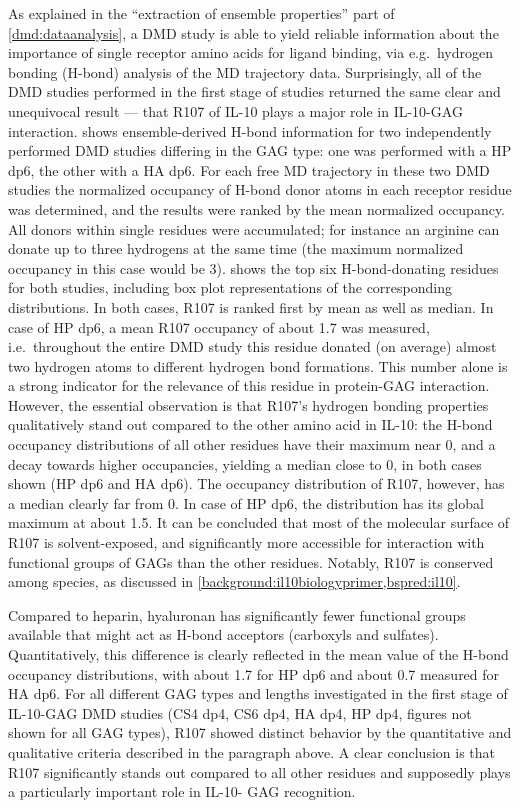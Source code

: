 As explained in the \enquote{extraction of ensemble properties} part of
\cref{dmd:dataanalysis}, a DMD study is able to yield reliable information
about the importance of single receptor amino acids for ligand binding, via
e.g.\ hydrogen bonding (H-bond) analysis of the MD trajectory data.
Surprisingly, all of the DMD studies performed in the first stage of studies
returned the same clear and unequivocal result --- that R107 of IL-10 plays a
major role in IL-10-GAG interaction. 
shows ensemble-derived H-bond information for two independently performed DMD
studies differing in the GAG type: one was performed with a HP dp6, the other
with a HA dp6. For each free MD trajectory in these two DMD studies the
normalized occupancy of H-bond donor atoms in each receptor residue was
determined, and the results were ranked by the mean normalized occupancy. All
donors within single residues were accumulated; for instance an arginine can
donate up to three hydrogens at the same time (the maximum normalized occupancy
in this case would be 3).  shows the
top six H-bond-donating residues for both studies, including box plot
representations of the corresponding distributions. In both cases, R107 is
ranked first by mean as well as median. In case of HP dp6, a mean R107 occupancy
of about 1.7 was measured, i.e.\ throughout the entire DMD study this residue
donated (on average) almost two hydrogen atoms to different hydrogen bond
formations. This number alone is a strong indicator for the relevance of this
residue in protein-GAG interaction. However, the essential observation is that
R107's hydrogen bonding properties qualitatively stand out compared to the other
amino acid in IL-10: the H-bond occupancy distributions of all other residues
have their maximum near 0, and a decay towards higher occupancies, yielding a
median close to 0, in both cases shown (HP dp6 and HA dp6). The occupancy
distribution of R107, however, has a median clearly far from 0. In case of HP
dp6, the distribution has its global maximum at about 1.5. It can be concluded
that most of the molecular surface of R107 is solvent-exposed, and significantly
more accessible for interaction with functional groups of GAGs than the other
residues. Notably, R107 is conserved among species, as discussed in
\cref{background:il10biologyprimer,bspred:il10}.

Compared to heparin, hyaluronan has significantly fewer functional groups
available that might act as H-bond acceptors (carboxyls and sulfates).
Quantitatively, this difference is clearly reflected in the mean value of the
H-bond occupancy distributions, with about 1.7 for HP dp6 and about 0.7 measured
for HA dp6. For all different GAG types and lengths investigated in the first
stage of IL-10-GAG DMD studies (CS4 dp4, CS6 dp4, HA dp4, HP dp4, figures not
shown for all GAG types), R107 showed distinct behavior by the quantitative and
qualitative criteria described in the paragraph above. A clear conclusion is
that R107 significantly stands out compared to all other residues and supposedly
plays a particularly important role in IL-10- GAG recognition.

